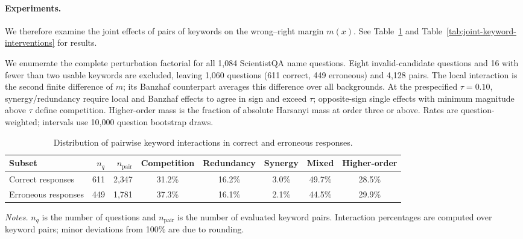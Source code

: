 \paragraph{Experiments.}
We therefore examine the joint effects of pairs of keywords on the wrong--right margin $m(x)$. See Table~\ref{tab:pairwise-keyword-interactions} and Table~\ref{tab:joint-keyword-interventions} for results.

We enumerate the complete perturbation factorial for all 1,084 ScientistQA name
questions. Eight invalid-candidate questions and 16 with fewer than two usable
keywords are excluded, leaving 1,060 questions (611 correct, 449 erroneous) and
4,128 pairs. The local interaction is the second finite difference of $m$; its
Banzhaf counterpart averages this difference over all backgrounds. At the
prespecified $\tau=0.10$, synergy/redundancy require local and Banzhaf effects
to agree in sign and exceed $\tau$; opposite-sign single effects with minimum
magnitude above $\tau$ define competition. Higher-order mass is the fraction
of absolute Harsanyi mass at order three or above. Rates are question-weighted;
intervals use 10,000 question bootstrap draws.

\begin{table}[t]
\centering
\caption{Distribution of pairwise keyword interactions in correct and erroneous responses.}
\label{tab:pairwise-keyword-interactions}
\small
\setlength{\tabcolsep}{5pt}
\begin{tabular}{lrrccccc}
\toprule
Subset & $n_q$ & $n_{\mathrm{pair}}$ & Competition & Redundancy & Synergy & Mixed & Higher-order \\
\midrule
Correct responses
& 611 & 2,347 & 31.2\% & 16.2\% & 3.0\% & 49.7\% & 28.5\% \\
Erroneous responses
& 449 & 1,781 & 37.3\% & 16.1\% & 2.1\% & 44.5\% & 29.9\% \\
\bottomrule
\end{tabular}

\vspace{2pt}
\begin{minipage}{0.96\linewidth}
\footnotesize
\textit{Notes.}
$n_q$ is the number of questions and $n_{\mathrm{pair}}$ is the number of evaluated keyword pairs.  Interaction percentages are computed over keyword pairs; minor deviations from 100\% are due to rounding.
\end{minipage}
\end{table}

